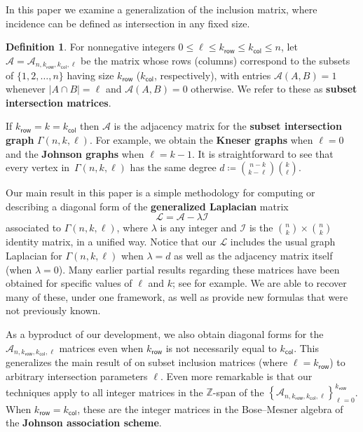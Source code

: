 \documentclass[11pt]{article}
\theoremstyle{definition}
\numberwithin{equation}{section}
\numberwithin{equation}{section}
\newtheorem{firstdef}{Definition}
\newcommand{\Z}[0]{\mathbb{Z}}
\renewcommand{\L}{\mathcal{L}}
\newcommand{\I}{\mathcal{I}}
\newcommand{\A}{\mathcal{A}}
\newcommand{\kr}{{k}_{\mathsf{row}}}
\newcommand{\kc}{{k}_{\mathsf{col}}}
\newcommand{\G}[0]{\Gamma}
\begin{document}
In this paper we examine a generalization of the inclusion matrix, where incidence can be defined as intersection in any fixed size.


\begin{firstdef}
For nonnegative integers $0 \leq \ell \leq \kr \leq \kc \leq n$, let $\A = \A_{n,\kr,\kc,\ell}$ be the matrix whose rows (columns) correspond to the subsets of $\{1, 2, \ldots, n\}$ having size $\kr$ ($\kc$, respectively), with entries $\A(A, B) = 1$ whenever $|A \cap B| = \ell$ and $\A(A, B) = 0$ otherwise.  
We refer to these as {\bf subset intersection matrices}.
\end{firstdef}



If $\kr = k = \kc$ then $\A$ is the adjacency matrix for the {\bf subset intersection graph} $\G(n,k,\ell)$.  
For example, we obtain the {\bf Kneser graphs}  when $\ell = 0$ and the {\bf Johnson graphs}  when $\ell = k - 1$.
It is straightforward to see that every vertex in~$\G(n,k,\ell)$ has the same degree $d \coloneqq  {\binom{n-k}{k-\ell} }\binom{k}{\ell}$.  

Our main result in this paper is a simple methodology for computing or describing a diagonal form of the {\bf generalized Laplacian} matrix
\[ \L = \A - \lambda \I \]
associated to $\G(n,k,\ell)$, where $\lambda$ is any integer and $\I$ is the $\binom{n}{k} \times \binom{n}{k}$ identity matrix, in a unified way.  Notice that our $\L$ includes the usual graph Laplacian for $\G(n,k,\ell)$ when $\lambda = d$ as well as the adjacency matrix itself (when $\lambda = 0$).  Many earlier partial results regarding these matrices have been obtained for specific values of $\ell$ and $k$; see \cite{line, brouwer:prank, duceysinhill, ds, wilson_classic} for example.  We are able to recover many of these, under one framework, as well as provide new formulas that were not previously known.  

As a byproduct of our development, we also obtain diagonal forms for the $\A_{n,\kr,\kc,\ell}$ matrices even when $\kr$ is not necessarily equal to $\kc$.  This generalizes the main result of \cite{wilson_classic} on subset inclusion matrices (where $\ell = \kr$) to arbitrary intersection parameters $\ell$.  Even more remarkable is that our techniques apply to all integer matrices in the $\Z$-span of the $\left \{ \A_{n,\kr,\kc,\ell}\right \}_{\ell = 0}^{\kr}$.  When $\kr = \kc$, these are the integer matrices in the Bose--Mesner algebra of the {\bf Johnson association scheme}.
\end{document}
